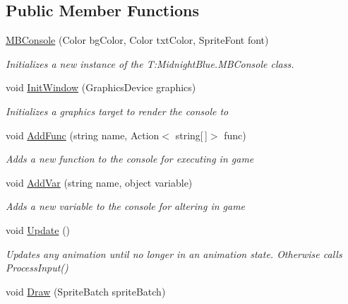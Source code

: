 \subsection*{Public Member Functions}
\begin{DoxyCompactItemize}
\item 
\hyperlink{class_midnight_blue_1_1_engine_1_1_m_b_console_ae4761c55bdd60ce3a49e6bb06b7c53af}{M\+B\+Console} (Color bg\+Color, Color txt\+Color, Sprite\+Font font)
\begin{DoxyCompactList}\small\item\em Initializes a new instance of the T\+:\+Midnight\+Blue.\+M\+B\+Console class. \end{DoxyCompactList}\item 
void \hyperlink{class_midnight_blue_1_1_engine_1_1_m_b_console_a08a6230b8a61577552243f30fa3b07a2}{Init\+Window} (Graphics\+Device graphics)
\begin{DoxyCompactList}\small\item\em Initializes a graphics target to render the console to \end{DoxyCompactList}\item 
void \hyperlink{class_midnight_blue_1_1_engine_1_1_m_b_console_a5438a91f83cf6082a20e8d2c417e6ce1}{Add\+Func} (string name, Action$<$ string\mbox{[}$\,$\mbox{]}$>$ func)
\begin{DoxyCompactList}\small\item\em Adds a new function to the console for executing in game \end{DoxyCompactList}\item 
void \hyperlink{class_midnight_blue_1_1_engine_1_1_m_b_console_a7533b96118e74197ac3f3085e026a591}{Add\+Var} (string name, object variable)
\begin{DoxyCompactList}\small\item\em Adds a new variable to the console for altering in game \end{DoxyCompactList}\item 
void \hyperlink{class_midnight_blue_1_1_engine_1_1_m_b_console_a94e6b48373f8dda4137ad79ecea8a40d}{Update} ()
\begin{DoxyCompactList}\small\item\em Updates any animation until no longer in an animation state. Otherwise calls Process\+Input() \end{DoxyCompactList}\item 
void \hyperlink{class_midnight_blue_1_1_engine_1_1_m_b_console_a807e956ca8a90cbcefb785e062d72b2d}{Draw} (Sprite\+Batch sprite\+Batch)

\end{DoxyCompactItemize}
